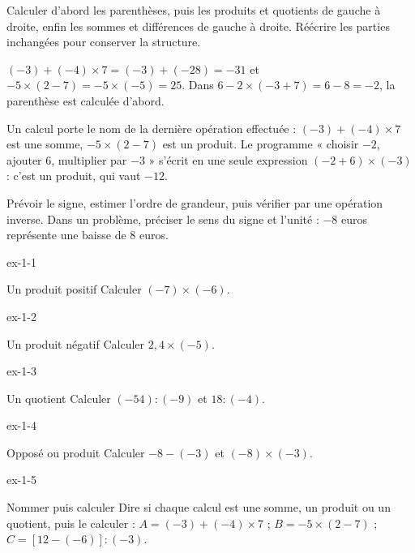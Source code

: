 \begin{savoirfaire}Calculer d’abord les parenthèses, puis les produits et quotients de gauche à droite, enfin les sommes et différences de gauche à droite. Réécrire les parties inchangées pour conserver la structure.\end{savoirfaire}
\begin{exemple}$(-3)+(-4)\times7=(-3)+(-28)=-31$ et $-5\times(2-7)=-5\times(-5)=25$. Dans $6-2\times(-3+7)=6-8=-2$, la parenthèse est calculée d’abord.\end{exemple}
\begin{definition}Un calcul porte le nom de la dernière opération effectuée : $(-3)+(-4)\times7$ est une somme, $-5\times(2-7)$ est un produit. Le programme « choisir $-2$, ajouter 6, multiplier par $-3$ » s’écrit en une seule expression $(-2+6)\times(-3)$ : c’est un produit, qui vaut $-12$.\end{definition}
\begin{savoirfaire}[Contrôler]Prévoir le signe, estimer l’ordre de grandeur, puis vérifier par une opération inverse. Dans un problème, préciser le sens du signe et l’unité : $-8$ euros représente une baisse de 8 euros.\end{savoirfaire}

\clearpage{}
\begin{blocLivre}{ex-1-1}\begin{exercice}[1]{Un produit positif}
Calculer $(-7)\times(-6)$.
\end{exercice}\end{blocLivre}
\begin{blocLivre}{ex-1-2}\begin{exercice}[1]{Un produit négatif}
Calculer $2{,}4\times(-5)$.
\end{exercice}\end{blocLivre}
\begin{blocLivre}{ex-1-3}\begin{exercice}[1]{Un quotient}
Calculer $(-54):(-9)$ et $18:(-4)$.
\end{exercice}\end{blocLivre}
\begin{blocLivre}{ex-1-4}\begin{exercice}[1]{Opposé ou produit}
Calculer $-8-(-3)$ et $(-8)\times(-3)$.
\end{exercice}\end{blocLivre}
\begin{blocLivre}{ex-1-5}\begin{exercice}[1]{Nommer puis calculer}
Dire si chaque calcul est une somme, un produit ou un quotient, puis le calculer : $A=(-3)+(-4)\times7$ ; $B=-5\times(2-7)$ ; $C=[12-(-6)]:(-3)$.
\end{exercice}\end{blocLivre}

